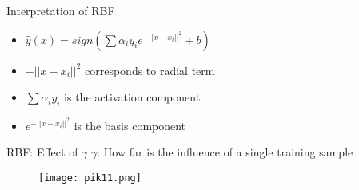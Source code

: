 \documentclass{beamer}
\begin{document}
	\begin{frame}{Interpretation of RBF}
		\begin{itemize}
\item $\hat{y}(x) = sign(\sum \alpha_{i}y_{i}e^{-\lvert\lvert x - x_{i} \rvert\rvert^{2}} + b)$
			\item ${-\lvert\lvert x - x_{i} \rvert\rvert^{2}}$ corresponds to radial term
			\pause
\item $\sum \alpha_{i}y_{i}$ is the activation component
			\item $e^{-\lvert\lvert x - x_{i} \rvert\rvert^{2}}$ is the basis component
		\end{itemize}

	\end{frame}
	\begin{frame}{RBF: Effect of $\gamma$}
	\vspace{2cm}
	    $\gamma$: How far is the influence of a single training sample \\
	    \vspace{-2cm}
	    \begin{minipage}{0.2\textwidth}
      \begin{figure}
      
       \texttt{[image: pik11.png]}
      \end{figure}
  \end{minipage} \\
	\end{frame}
\end{document}
